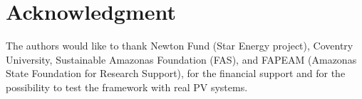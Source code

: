 \documentclass[journal]{IEEEtran}
\begin{document}
%





\section*{Acknowledgment}
The authors would like to thank Newton Fund (Star Energy project), Coventry University, Sustainable Amazonas Foundation (FAS), and FAPEAM (Amazonas State Foundation for Research Support), for the financial support and for the possibility to test the framework with real PV systems.








{}
%
\end{document}

